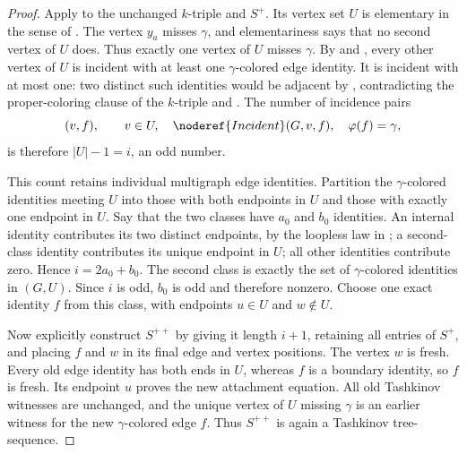 \begin{proof}
Apply  to the unchanged $k$-triple and $S^+$.  Its
vertex set $U$ is elementary in the sense of
.  The vertex $y_a$ misses $\gamma$,
and elementariness says that no second vertex of $U$ does.  Thus exactly
one vertex of $U$ misses $\gamma$.  By  and
, every other vertex of $U$ is incident with at
least one $\gamma$-colored edge identity.  It is incident with at most one:
two distinct such identities would be adjacent by
, contradicting the proper-coloring clause of the
$k$-triple and .  The number of incidence
pairs
\[
 (v,f),\qquad v\in U,\quad \noderef{Incident}(G,v,f),\quad
 \varphi(f)=\gamma,
\]
is therefore $|U|-1=i$, an odd number.

This count retains individual multigraph edge identities.  Partition the
$\gamma$-colored identities meeting $U$ into those with both endpoints in
$U$ and those with exactly one endpoint in $U$.  Say that the two classes
have $a_0$ and $b_0$ identities.  An internal identity contributes its two
distinct endpoints, by the loopless law in
; a second-class identity contributes its
unique endpoint in $U$; all other identities contribute zero.  Hence
$i=2a_0+b_0$.  The second class is exactly the set of $\gamma$-colored
identities in $(G,U)$.  Since $i$ is odd, $b_0$ is
odd and therefore nonzero.  Choose one exact identity $f$ from this class,
with endpoints $u\in U$ and $w\notin U$.

Now explicitly construct $S^{++}$ by giving it length $i+1$, retaining all
entries of $S^+$, and placing $f$ and $w$ in its final edge and vertex
positions.  The vertex $w$ is fresh.  Every old edge identity has both ends
in $U$, whereas $f$ is a boundary identity, so $f$ is fresh.  Its endpoint
$u$ proves the new attachment equation.  All old Tashkinov witnesses are
unchanged, and the unique vertex of $U$ missing $\gamma$ is an earlier
witness for the new $\gamma$-colored edge $f$.  Thus $S^{++}$ is again a
Tashkinov tree-sequence.


\end{proof}
